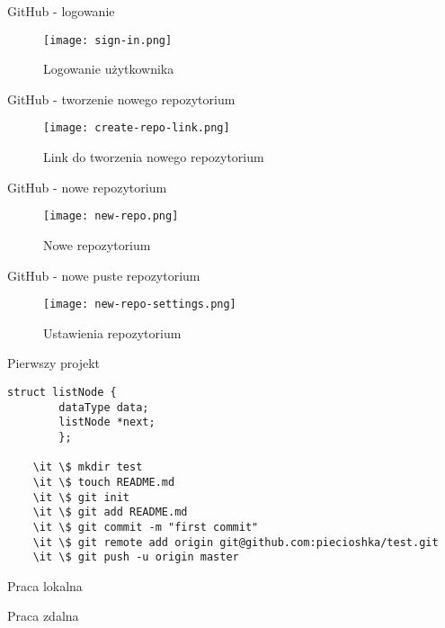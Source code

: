 \documentclass{beamer}
\begin{document}
\begin{frame}{GitHub - logowanie}
	\begin{figure}
	\texttt{[image: sign-in.png]}
	\caption{\label{fig:sign-in}Logowanie użytkownika}
	\end{figure}
\end{frame}

\begin{frame}{GitHub - tworzenie nowego repozytorium}
	\begin{figure}
	\texttt{[image: create-repo-link.png]}
	\caption{\label{fig:create-repo-link}Link do tworzenia nowego repozytorium}
	\end{figure}
\end{frame}

\begin{frame}{GitHub - nowe repozytorium}
	\begin{figure}
	\texttt{[image: new-repo.png]}
	\caption{\label{fig:new-repo}Nowe repozytorium}
	\end{figure}
\end{frame}

\begin{frame}{GitHub - nowe puste repozytorium}
	\begin{figure}
	\texttt{[image: new-repo-settings.png]}
	\caption{\label{fig:new-repo-settings}Ustawienia repozytorium}
	\end{figure}
\end{frame}

\begin{frame}{Pierwszy projekt}


	
	\begin{lstlisting}[frame=single]
	    struct listNode {
	    dataType data;
	    listNode *next;
	    };
		
	\it \$ mkdir test
	\it \$ touch README.md
	\it \$ git init
	\it \$ git add README.md
	\it \$ git commit -m "first commit"
	\it \$ git remote add origin git@github.com:piecioshka/test.git
	\it \$ git push -u origin master
	    \end{lstlisting}
\end{frame}

\begin{frame}{Praca lokalna}
\end{frame}

\begin{frame}{Praca zdalna}
\end{frame}
\end{document}
